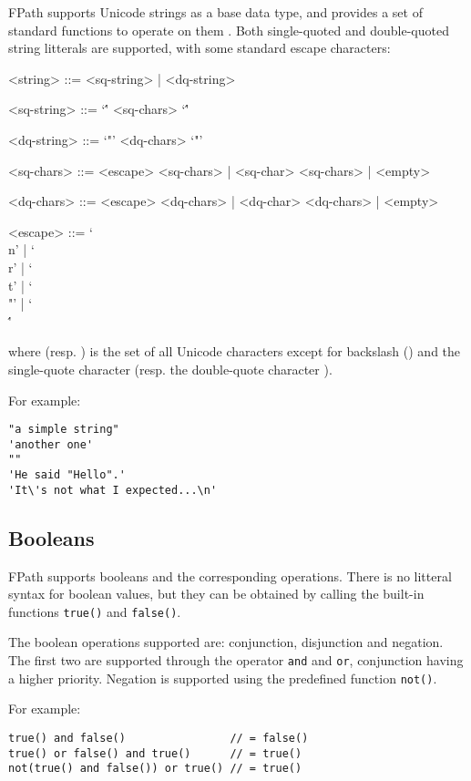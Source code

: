 \documentclass[a4paper,12pt]{report}
\begin{document}
FPath supports Unicode strings as a base data type, and provides a set of standard
functions to operate on them%
. Both single-quoted and double-quoted string
litterals are supported, with some standard escape characters:
\begin{grammar}
<string> ::= <sq-string> | <dq-string>

<sq-string> ::= `\'' <sq-chars> `\''

<dq-string> ::= `"' <dq-chars> `"'

<sq-chars> ::= <escape> <sq-chars> | <sq-char> <sq-chars> | <empty>

<dq-chars> ::= <escape> <dq-chars> | <dq-char> <dq-chars> | <empty>

<escape> ::= `\\n' | `\\r' | `\\t' | `\\"' | `\\\''
\end{grammar}

where  (resp. ) is the set of all Unicode characters except
for backslash (\lit{$\backslash$}) and the single-quote character  (resp. the
double-quote character ).

For example:
\begin{verbatim}
"a simple string"
'another one'
""
'He said "Hello".'
'It\'s not what I expected...\n'
\end{verbatim}

\subsection{Booleans}
\label{sec:booleans}

FPath supports booleans and the corresponding operations. There is no litteral syntax for
boolean values, but they can be obtained by calling the built-in functions \texttt{true()}
and \texttt{false()}.

The boolean operations supported are: conjunction, disjunction and negation. The first two
are supported through the operator \texttt{and} and \texttt{or}, conjunction having a
higher priority. Negation is supported using the predefined function \texttt{not()}.

For example:
\begin{verbatim}
true() and false()                // = false()
true() or false() and true()      // = true()
not(true() and false()) or true() // = true()
\end{verbatim}
\end{document}
